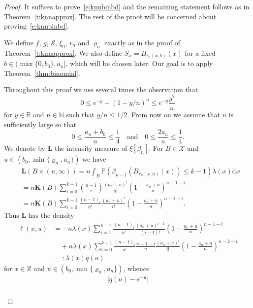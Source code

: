 \documentclass[10pt]{amsart}
\theoremstyle{definition}\newtheorem{defi}[theo]{Definition}\newtheorem{rema}[theo]{Remark}\newtheorem{exam}[theo]{Example}\newtheorem{exem}[theo]{Example}\newtheorem{nota}[theo]{Notation}
\newcommand*\bL{\mathbf{L}}
\newcommand*\bK{\mathbf{K}}
\newcommand*\N{\mathbb{N}}
\newcommand*\R{\mathbb{R}}
\renewcommand*\P{\mathbb{P}}
\newcommand*\X{\mathbb{X}}
\newcommand*\cS{\mathcal{S}}
\newcommand*\cX{\mathcal{X}}
\newcommand*\md{\mathrm{d}}
\newcommand{\prob}[1]{\P\left(#1\right)}
\begin{document}
\begin{proof}
It suffices to prove~\eqref{e:knnbinbd} and the remaining statement follows as in Theorem~\ref{t:knnapprox}. The rest of the proof will be concerned about proving~\eqref{e:knnbinbd}.

We define $f$, $g$, $\cS$, $\xi_0$, $r_n$ and $\varrho_n$ exactly as in the proof of Theorem~\ref{t:knnapprox}. We also define $S_x=B_{r_n(x,b)}(x)$ for a fixed $b\in(\max\{0,b_0\},a_n {]}$, which will be chosen later. Our goal is to apply Theorem~\ref{thm:binomial}.

Throughout this proof we use several times the observation that
\begin{equation}\label{e:ApproximationExponential}
0 \leq e^{-y} - (1-y/n)^n \leq e^{-y} \frac{y^2}{n}
\end{equation}
for $y\in\R$ and $n\in\N$ such that $y/n\leq 1/2$. From now on we assume that $n$ is sufficiently large so that
\begin{equation}\label{e:Assumption_a_n}
0 \leq \frac{a_n+b_0}{n} \leq \frac{1}{4} \quad \text{and} \quad 0\leq \frac{2 a_n}{n}\leq \frac{1}{4}.
\end{equation}
We denote by $\bL$ the intensity measure of $\xi[\beta_n]$. For $B\in\cX$ and $u\in(b_0,\min\{\varrho_n,a_n\})$ we have
\begin{align*}
& \bL(B\times(u,\infty)) = n \int_B \prob{\beta_{n-1}\left(B_{r_n(x,u)}(x)\right)\leq k-1} \lambda(x) \md x \\
& = n \bK(B) \sum_{i=0}^{k-1} \binom{n-1}{i} \frac{(a_n+u)^i}{n^i} \left(1 - \frac{a_n+u}{n} \right)^{n-1-i} \\&= n \bK(B) \sum_{i=0}^{k-1} \frac{(n-1)_i}{n^i} \frac{(a_n+u)^i}{i!} \left(1 - \frac{a_n+u}{n} \right)^{n-1-i}.
\end{align*}
Thus $\bL$ has the density
\begin{align*}
\ell(x,u) & = -n \lambda(x)\sum_{i=1}^{k-1} \frac{(n-1)_i}{n^i} \frac{(a_n+u)^{i-1}}{(i-1)!} \left(1 - \frac{a_n+u}{n} \right)^{n-1-i} \\ & \quad + n \lambda(x) \sum_{i=0}^{k-1} \frac{(n-1)_i}{n^i} \frac{n-1-i}{n} \frac{(a_n+u)^i}{i!} \left(1 - \frac{a_n+u}{n} \right)^{n-2-i} \\
& =: \lambda(x) q(u)
\end{align*}
for $x\in\X$ and $u\in(b_0,\min\{\varrho_n,a_n\})$, whence
\begin{multline*}
\left|q(u) - e^{-u}\right|\\
\begin{aligned}

\end{aligned}
\end{multline*}
\end{proof}
\end{document}
